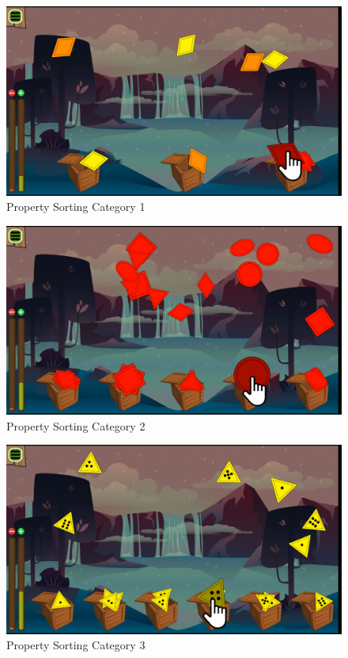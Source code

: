 \begin{figure}[H]
    \centering
    \includegraphics[width=1\textwidth]{figures/property1}
    \caption{Property Sorting Category 1}
    \label{fig:property1}
\end{figure}

\begin{figure}[H]
    \centering
    \includegraphics[width=1\textwidth]{figures/property2}
    \caption{Property Sorting Category 2}
    \label{fig:property2}
\end{figure}

\begin{figure}[H]
    \centering
    \includegraphics[width=1\textwidth]{figures/property3}
    \caption{Property Sorting Category 3}
    \label{fig:property3}
\end{figure}


